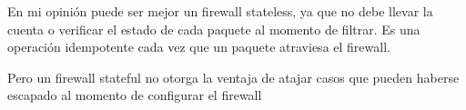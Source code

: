 En mi opinión puede ser mejor un firewall stateless, ya que no debe llevar la cuenta o verificar el estado de cada paquete al momento de filtrar. Es una operación idempotente cada vez que un paquete atraviesa el firewall.

Pero un firewall stateful no otorga la ventaja de atajar casos que pueden haberse escapado al momento de configurar el firewall
\newpage
\printbibliography









